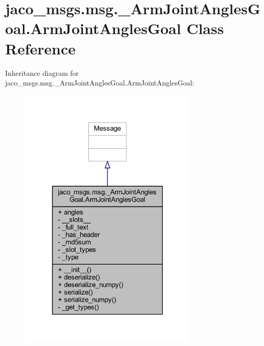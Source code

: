\hypertarget{classjaco__msgs_1_1msg_1_1__ArmJointAnglesGoal_1_1ArmJointAnglesGoal}{}\section{jaco\+\_\+msgs.\+msg.\+\_\+\+Arm\+Joint\+Angles\+Goal.\+Arm\+Joint\+Angles\+Goal Class Reference}
\label{classjaco__msgs_1_1msg_1_1__ArmJointAnglesGoal_1_1ArmJointAnglesGoal}


Inheritance diagram for jaco\+\_\+msgs.\+msg.\+\_\+\+Arm\+Joint\+Angles\+Goal.\+Arm\+Joint\+Angles\+Goal\+:
\nopagebreak
\begin{figure}[H]
\begin{center}
\leavevmode
\includegraphics[width=242pt]{d0/d06/classjaco__msgs_1_1msg_1_1__ArmJointAnglesGoal_1_1ArmJointAnglesGoal__inherit__graph}
\end{center}
\end{figure}


